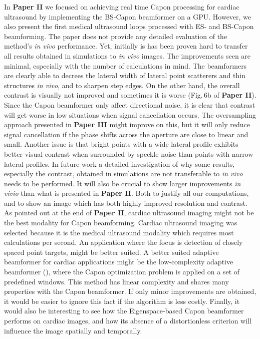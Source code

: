 In \textbf{Paper II} we focused on achieving real time Capon processing for cardiac ultrasound by implementing the BS-Capon beamformer on a GPU. However, we also present the first medical ultrasound loops processed with ES- and BS-Capon beamforming.  The paper does not provide any detailed evaluation of the method's \textit{in vivo} performance. Yet, initially is has been proven hard to transfer all results obtained in simulations to \textit{in vivo} images. The improvements seen are minimal, especially with the number of calculations in mind. The beamformers are clearly able to decrees the lateral width of lateral point scatterers and thin structures \textit{in vivo}, and to sharpen step edges. On the other hand, the overall contrast is visually not improved and sometimes it is worse (Fig.\,6b of \textbf{Paper II}). Since the Capon beamformer only affect directional noise, it is clear that contrast will get worse in low  situations when signal cancellation occurs. The oversampling approach presented in \textbf{Paper III} might improve on this, but it will only reduce signal cancellation if the phase shifts across the aperture are close to linear and small. Another issue is that bright points with a wide lateral profile exhibits better visual contrast when surrounded by speckle noise than points with narrow lateral profiles. In future work a detailed investigation of why some results, especially the contrast, obtained in simulations are not transferable to \textit{in vivo} needs to be performed. It will also be crucial to show larger improvements \textit{in vivio} than what is presented in \textbf{Paper II}. Both to justify all our computations, and to show an image which has both highly improved resolution and contrast. As pointed out at the end of \textbf{Paper II}, cardiac ultrasound imaging might not be the best modality for Capon beamforming. Cardiac ultrasound imaging was selected because it is the medical ultrasound modality which requires most calculations per second. An application where the focus is detection of closely spaced point targets, might be better suited. A better suited adaptive beamformer for cardiac applications might be the low-complexity adaptive beamformer (), where the Capon optimization problem is applied on a set of predefined windows. This method has linear complexity and shares many properties with the Capon beamformer. If only minor improvements are obtained, it would be easier to ignore this fact if the algorithm is less costly. Finally, it would also be interesting to see how the Eigenspace-based Capon beamformer performs on cardiac images, and how its absence of a distortionless criterion will influence the image spatially and temporally.
